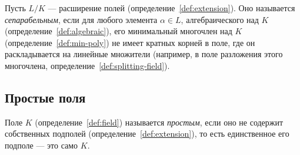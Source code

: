 \documentclass[12pt]{article}
\begin{document}
    \begin{definition}\label{def:separable}
    	Пусть $L/K$ --- расширение полей (определение~\ref{def:extension}). Оно называется \emph{сепарабельным}, если для любого элемента $\alpha \in L$, алгебраического над $K$ (определение~\ref{def:algebraic}), его минимальный многочлен над $K$ (определение~\ref{def:min-poly}) не имеет кратных корней в поле, где он раскладывается на линейные множители (например, в поле разложения этого многочлена, определение~\ref{def:splitting-field}).
    \end{definition}
    
    \subsection{Простые поля}
    
    \begin{definition}\label{def:prime-field}
    	Поле $K$ (определение~\ref{def:field}) называется \emph{простым}, если оно не содержит собственных подполей (определение~\ref{def:extension}), то есть единственное его подполе --- это само $K$.
    \end{definition}
    
\end{document}
